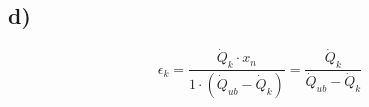 

\subsection*{d)}
\[
\epsilon_k = \frac{\dot{Q}_k \cdot x_n}{1 \cdot \left( \dot{Q}_{ub} - \dot{Q}_k \right)} = \frac{\dot{Q}_k}{\dot{Q}_{ub} - \dot{Q}_k}
\]